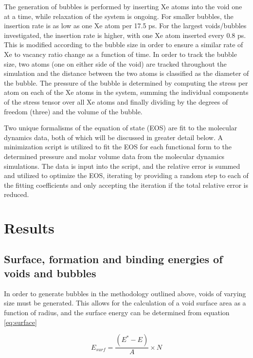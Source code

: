 \documentclass[review]{elsarticle}
\begin{document}
The generation of bubbles is performed by inserting Xe atoms into the void one at a time, while relaxation of the system is ongoing. For smaller bubbles, the insertion rate is as low as one Xe atom per 17.5 ps. For the largest voids/bubbles investigated, the insertion rate is higher, with one Xe atom inserted every 0.8 ps. This is modified according to the bubble size in order to ensure a similar rate of Xe to vacancy ratio change as a function of time. In order to track the bubble size, two atoms (one on either side of the void) are tracked throughout the simulation and the distance between the two atoms is classified as the diameter of the bubble. The pressure of the bubble is determined by computing the stress per atom on each of the Xe atoms in the system, summing the individual components of the stress tensor over all Xe atoms and finally dividing by the degrees of freedom (three) and the volume of the bubble. 

Two unique formalisms of the equation of state (EOS) are fit to the molecular dynamics data, both of which will be discussed in greater detail below. A minimization script is utilized to fit the EOS for each functional form to the determined pressure and molar volume data from the molecular dynamics simulations. The data is input into the script, and the relative error is summed and utilized to optimize the EOS, iterating by providing a random step to each of the fitting coefficients and only accepting the iteration if the total relative error is reduced. 

\section{Results}

\subsection{Surface, formation and binding energies of voids and bubbles}

In order to generate bubbles in the methodology outlined above, voids of varying size must be generated. This allows for the calculation of a void surface area as a function of radius, and the surface energy can be determined from equation \ref{eq:surface}

\begin{equation}
\label{eq:surface}
E_{surf}= \frac{(E^{*} - E)}{A} \times N
\end{equation}
\end{document}
